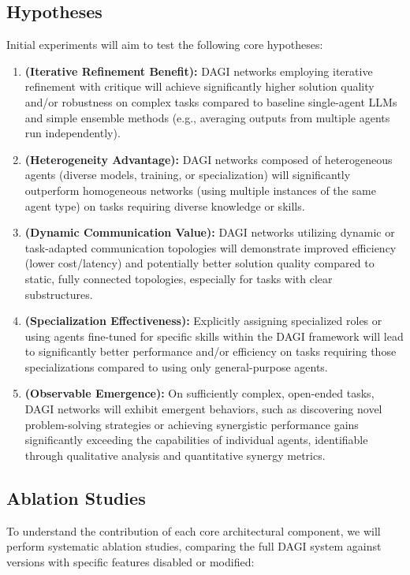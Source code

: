 \documentclass[12pt]{amsart}
\begin{document}
\subsection{Hypotheses}
\label{subsec:hypotheses}
Initial experiments will aim to test the following core hypotheses:

\begin{enumerate}[label=\textbf{H\arabic*:}, leftmargin=*]
    \item \textbf{(Iterative Refinement Benefit):} DAGI networks employing iterative refinement with critique will achieve significantly higher solution quality and/or robustness on complex tasks compared to baseline single-agent LLMs and simple ensemble methods (e.g., averaging outputs from multiple agents run independently).
    \item \textbf{(Heterogeneity Advantage):} DAGI networks composed of heterogeneous agents (diverse models, training, or specialization) will significantly outperform homogeneous networks (using multiple instances of the same agent type) on tasks requiring diverse knowledge or skills.
    \item \textbf{(Dynamic Communication Value):} DAGI networks utilizing dynamic or task-adapted communication topologies will demonstrate improved efficiency (lower cost/latency) and potentially better solution quality compared to static, fully connected topologies, especially for tasks with clear substructures.
    \item \textbf{(Specialization Effectiveness):} Explicitly assigning specialized roles or using agents fine-tuned for specific skills within the DAGI framework will lead to significantly better performance and/or efficiency on tasks requiring those specializations compared to using only general-purpose agents.
    \item \textbf{(Observable Emergence):} On sufficiently complex, open-ended tasks, DAGI networks will exhibit emergent behaviors, such as discovering novel problem-solving strategies or achieving synergistic performance gains significantly exceeding the capabilities of individual agents, identifiable through qualitative analysis and quantitative synergy metrics.
\end{enumerate}

\subsection{Ablation Studies}
\label{subsec:ablation_studies}
To understand the contribution of each core architectural component, we will perform systematic ablation studies, comparing the full DAGI system against versions with specific features disabled or modified:
\end{document}
